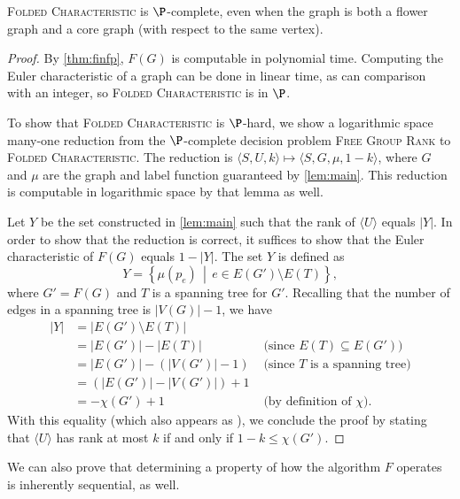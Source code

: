 \documentclass{elsarticlenonatbib}
\newcommand{\FGR}{\textsc{Free Group Rank}}
\newcommand{\FC}{\textsc{Folded Characteristic}}
\newcommand{\gen}[1]{\langle #1 \rangle}
\begin{document}
\begin{theorem}\label{thm:fdpcomplete}
  \FC{} is $\P$-complete, even when the graph is both a flower graph and a core graph (with respect to the same vertex).
\end{theorem}
\begin{proof}
  By \autoref{thm:finfp}, $F(G)$ is computable in polynomial time.
  Computing the Euler characteristic of a graph can be done in linear time, as can comparison with an integer, so \FC{} is in $\P$.

  To show that \FC{} is $\P$-hard, we show a logarithmic space many-one reduction from the $\P$-complete decision problem \FGR{} to \FC{}.
  The reduction is $\langle S, U, k \rangle \mapsto \langle S, G, \mu, 1 - k \rangle$, where $G$ and $\mu$ are the graph and label function guaranteed by \autoref{lem:main}.
  This reduction is computable in logarithmic space by that lemma as well.

  Let $Y$ be the set constructed in \autoref{lem:main} such that the rank of $\gen{U}$ equals $|Y|$.
  In order to show that the reduction is correct, it suffices to show that the Euler characteristic of $F(G)$ equals $1 - |Y|$.
  The set $Y$ is defined as
  \begin{equation*}
    Y = \left\{\mu(p_e) \, \middle| \, e \in E(G') \setminus E(T) \right\},
  \end{equation*}
  where $G' = F(G)$ and $T$ is a spanning tree for $G'$.
  Recalling that the number of edges in a spanning tree is $|V(G)| - 1$, we have
  \begin{align*}
    |Y| & = |E(G') \setminus E(T)| & \\
    & = |E(G')| - |E(T)| & \text{ (since } E(T) \subseteq E(G') \text{)} \\
    & = |E(G')| - (|V(G')| - 1) & \text{ (since } T \text{ is a spanning tree)} \\
    & = (|E(G')| - |V(G')|) + 1 & \\
    & = -\chi(G') + 1 & \text{ (by definition of } \chi \text{)}.
  \end{align*}
  With this equality (which also appears as \autocite[Lemma~8.2]{km02}), we conclude the proof by stating that $\gen{U}$ has rank at most $k$ if and only if $1 - k \leq \chi(G')$.
\end{proof}

We can also prove that determining a property of how the algorithm $F$ operates is inherently sequential, as well.
\end{document}
